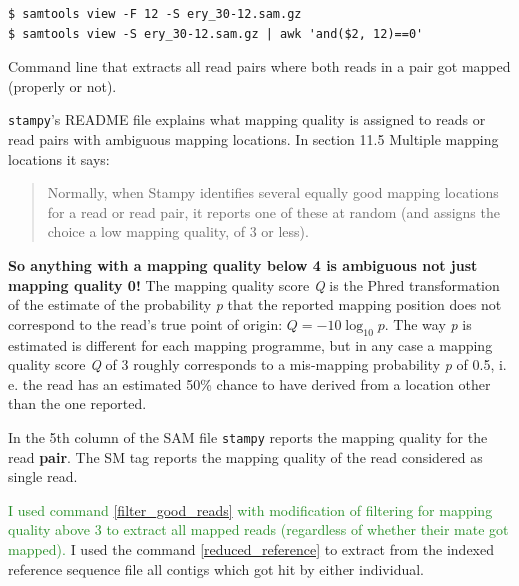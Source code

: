 \documentclass{article}\usepackage[]{graphicx}\usepackage[]{color}
\newcommand{\roger}[1]{ \textcolor[named]{ForestGreen}{#1} }
\begin{document}
\begin{command}
\captionsetup{type=command} %
\begin{Verbatim}
$ samtools view -F 12 -S ery_30-12.sam.gz
$ samtools view -S ery_30-12.sam.gz | awk 'and($2, 12)==0'
\end{Verbatim}
\caption{Command line that extracts all read pairs where both reads in a pair got mapped (properly or not).}
\label{filter_unmapped_read_pairs}
\end{command}

\texttt{stampy}'s README file explains what mapping quality is assigned to reads or read pairs with ambiguous mapping locations. In section \textrm{11.5 Multiple mapping locations} it says:
\begin{quote}
\textsf{
Normally, when Stampy identifies several equally good mapping locations for a read or read pair, it reports one of these at random (and assigns the choice a low mapping quality, of 3 or less).
}
\end{quote}
\textbf{So anything with a mapping quality below 4 is ambiguous not just mapping quality 0!} The mapping quality score \emph{Q} is the Phred transformation of the estimate of the probability \emph{p} that the reported mapping position does not correspond to the read's true point of origin: $Q = -10 \log_{10} p$. The way \emph{p} is estimated is different for each mapping programme, but in any case a mapping quality score \emph{Q} of 3 roughly corresponds to a mis-mapping probability \emph{p} of 0.5, i. e. the read has an estimated 50\% chance to have derived from a location other than the one reported.

In the 5th column of the SAM file \texttt{stampy} reports the mapping quality for the read \textbf{pair}. The SM tag reports the mapping quality of the read considered as single read.

\roger{I used command \ref{filter_good_reads} with modification of filtering for mapping quality above 3 to extract all mapped reads (regardless of whether their mate got mapped).}
I used the command \ref{reduced_reference} to extract from the indexed reference sequence file all contigs which got hit by either individual.
\end{document}

